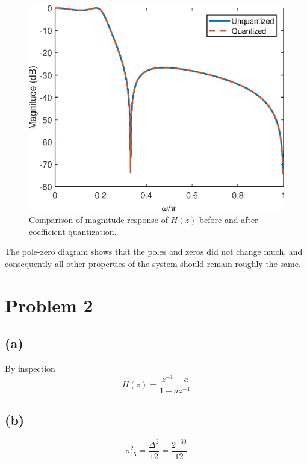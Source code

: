 \documentclass{article}
\begin{document}
\FloatBarrier
\begin{figure}[h!]
	\centering
	\includegraphics[scale=0.7]{figs/hw04q6_mag.eps}
	\caption{Comparison of magnitude response of $H(z)$ before and after coefficient quantization.}
\end{figure}
\FloatBarrier

The pole-zero diagram shows that the poles and zeros did not change much, and consequently all other properties of the system should remain roughly the same.


\newpage
\section{Problem 2}

\subsection{(a)}
By inspection
\begin{equation}
	H(z) = \frac{z^{-1} - a}{1 - az^{-1}}
\end{equation}

\subsection{(b)}

\begin{equation}
\sigma_{15}^2 = \frac{\Delta^2}{12} = \frac{2^{-30}}{12}
\end{equation}

\begin{figure}[!h]
	\centering
	
\end{figure}
\end{document}
